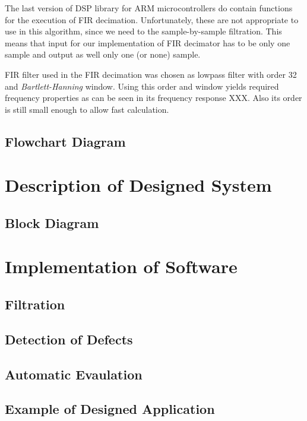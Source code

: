 \documentclass[twoside]{ctuthesis}
\theoremstyle{plain}
\theoremstyle{definition}
\theoremstyle{note}
\begin{document}
The last version of DSP library for ARM microcontrollers do contain functions for the execution of FIR decimation. Unfortunately, these are not appropriate to use in this algorithm, since we need to the sample-by-sample filtration. This means that input for our implementation of FIR decimator has to be only one sample and output as well only one (or none) sample. 

FIR filter used in the FIR decimation was chosen as lowpass filter with order 32 and \textit{Bartlett-Hanning} window. Using this order and window yields required frequency properties as can be seen in its frequency response XXX. Also its order is still small enough to allow fast calculation. 



\subsection{Flowchart Diagram}
\section{Description of Designed System}
\subsection{Block Diagram}
\section{Implementation of Software}
\subsection{Filtration}
\subsection{Detection of Defects}
\subsection{Automatic Evaulation}
\subsection{Example of Designed Application}
\end{document}
